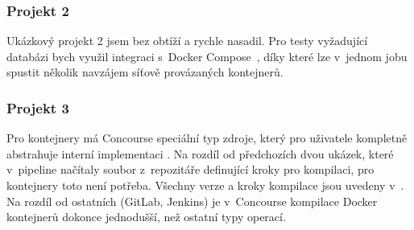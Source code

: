         \subsubsection{Projekt 2}
            Ukázkový projekt 2 jsem bez obtíží a rychle nasadil. Pro testy vyžadující databázi bych využil integraci s~Docker Compose~\cite{concourse-compose}, díky které lze v~jednom jobu spustit několik navzájem síťově provázaných kontejnerů.

        \subsubsection{Projekt 3}
            Pro kontejnery má Concourse speciální typ zdroje, který pro uživatele kompletně abstrahuje interní implementaci . Na rozdíl od předchozích dvou ukázek, které v~pipeline načítaly soubor z~repozitáře definující kroky pro kompilaci, pro kontejnery toto není potřeba. Všechny verze a kroky kompilace jsou uvedeny v~. Na rozdíl od ostatních \CI (GitLab, Jenkins) je v~Concourse kompilace Docker kontejnerů dokonce jednodušší, než ostatní typy operací.
